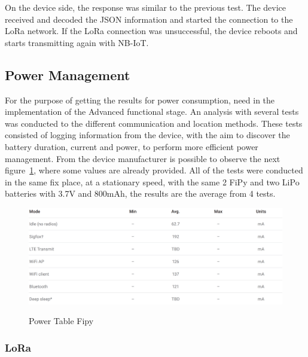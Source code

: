 On the device side, the response was similar to the previous test. The device received and decoded the JSON information and started the connection to the LoRa network. If the LoRa connection was unsuccessful, the device reboots and starts transmitting again with NB-IoT.


\newpage
\subsection{Power Management}
\label{subsec:power_management}

For the purpose of getting the results for power consumption, need in the implementation of the Advanced functional stage. An analysis with several tests was conducted to the different communication  and location methods. These tests consisted of logging information from the device, with the aim to discover the battery duration, current and power, to perform  more efficient power management. From the device manufacturer is possible to observe the next figure~\ref{fig:PowerTableAll}, where some values are already provided. All of the tests were conducted in the same fix place, at a  stationary speed, with the same 2 FiPy and two LiPo batteries with 3.7V and 800mAh, the results are the average from 4 tests.

\begin{figure}[htbp]
  \centering
  
    {\includegraphics[width=0.93\linewidth]{Chapters/Figures/power1.PNG}}%
 
  \caption{Power Table Fipy~\cite{Microcontroller2017}}
  \label{fig:PowerTableAll}
\end{figure}


\subsubsection{LoRa}
\label{subsec:LoRa}


